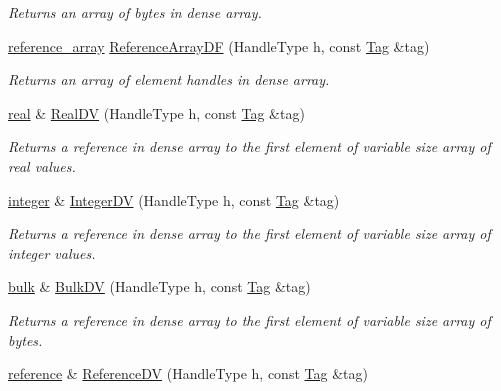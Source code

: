 \begin{DoxyCompactItemize}
\begin{DoxyCompactList}\small\item\em Returns an array of bytes in dense array. \end{DoxyCompactList}\item 
\hyperlink{classINMOST_1_1Storage_1_1reference__array}{reference\-\_\-array} \hyperlink{classINMOST_1_1Mesh_a92ba4c935940111e2c9584a9cc96fe6f}{Reference\-Array\-D\-F} (Handle\-Type h, const \hyperlink{classINMOST_1_1Tag}{Tag} \&tag)
\begin{DoxyCompactList}\small\item\em Returns an array of element handles in dense array. \end{DoxyCompactList}\item 
\hyperlink{classINMOST_1_1Storage_a853346784b4a5822a7fac54d8f10f805}{real} \& \hyperlink{classINMOST_1_1Mesh_a679a4a6ed4e4508126919b8fc8fea27a}{Real\-D\-V} (Handle\-Type h, const \hyperlink{classINMOST_1_1Tag}{Tag} \&tag)
\begin{DoxyCompactList}\small\item\em Returns a reference in dense array to the first element of variable size array of real values. \end{DoxyCompactList}\item 
\hyperlink{classINMOST_1_1Storage_aec96942bc647417a801e2895b45964d2}{integer} \& \hyperlink{classINMOST_1_1Mesh_af20ebec0bab305054c5960d7683bfcfd}{Integer\-D\-V} (Handle\-Type h, const \hyperlink{classINMOST_1_1Tag}{Tag} \&tag)
\begin{DoxyCompactList}\small\item\em Returns a reference in dense array to the first element of variable size array of integer values. \end{DoxyCompactList}\item 
\hyperlink{classINMOST_1_1Storage_ae429556af77094077d212e0ac23c8cfc}{bulk} \& \hyperlink{classINMOST_1_1Mesh_a35a62a1c63ac51297dddabb1312f32d1}{Bulk\-D\-V} (Handle\-Type h, const \hyperlink{classINMOST_1_1Tag}{Tag} \&tag)
\begin{DoxyCompactList}\small\item\em Returns a reference in dense array to the first element of variable size array of bytes. \end{DoxyCompactList}\item 
\hyperlink{classINMOST_1_1Storage_a8674802045ec170a3c9d0e3281545b54}{reference} \& \hyperlink{classINMOST_1_1Mesh_ac87430b220565362949e68b073e07c8a}{Reference\-D\-V} (Handle\-Type h, const \hyperlink{classINMOST_1_1Tag}{Tag} \&tag)

\end{DoxyCompactItemize}
